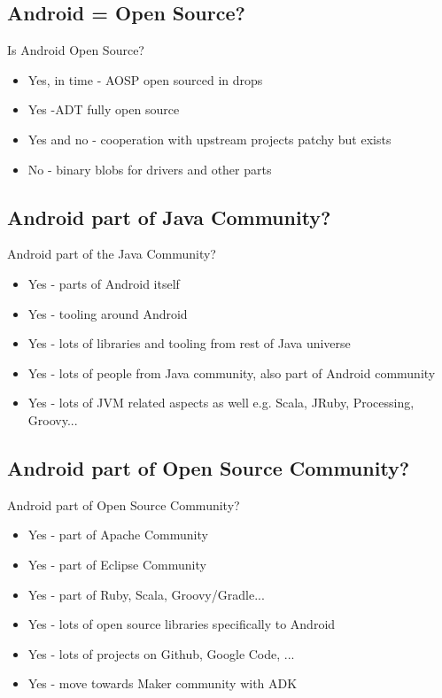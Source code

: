 \documentclass[aspectratio=169]{beamer}
\begin{document}
  \subsection{Android = Open Source?}
    \begin{frame}{Is Android Open Source?}
      \begin{itemize}
       \item<1-> Yes, in time - AOSP open sourced in drops
       \item<2-> Yes -ADT fully open source
       \item<3-> Yes and no - cooperation with upstream projects patchy but exists
       \item<4-> No - binary blobs for drivers and other parts
      \end{itemize}
    \end{frame}

  \subsection{Android part of Java Community?}
    \begin{frame}{Android part of the Java Community?}
     \begin{itemize}
      \item<1-> Yes - parts of Android itself
      \item<2-> Yes - tooling around Android
      \item<3-> Yes - lots of libraries and tooling from rest of Java universe
      \item<4-> Yes - lots of people from Java community, also part of Android community
      \item<5-> Yes - lots of JVM related aspects as well e.g. Scala, JRuby, Processing, Groovy...
      \end{itemize}
    \end{frame}
  
  \subsection{Android part of Open Source Community?}
    \begin{frame}{Android part of Open Source Community?}
     \begin{itemize}
      \item<1-> Yes - part of Apache Community
      \item<2-> Yes - part of Eclipse Community
      \item<3-> Yes - part of Ruby, Scala, Groovy/Gradle...
      \item<4-> Yes - lots of open source libraries specifically to Android
      \item<5-> Yes - lots of projects on Github, Google Code, ...
      \item<6-> Yes - move towards Maker community with ADK
     \end{itemize}
    \end{frame}
\end{document}

